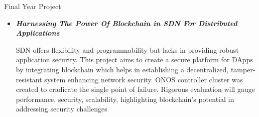 \documentclass{resume} %
\begin{document}
\begin{rSection}{Final Year Project} 
\vspace{0.25cm}
\begin{itemize}
    \item \textbf{\textit{Harnessing The Power Of Blockchain in SDN
For Distributed Applications}} 

  SDN offers flexibility and programmability
but lacks in providing robust application
security. This project aims to create a secure
platform for DApps by integrating blockchain
which helps in establishing a decentralized,
tamper-resistant system enhancing network
security. ONOS controller cluster was created
to eradicate the single point of failure.
Rigorous evaluation will gauge performance,
security, scalability, highlighting blockchain's
potential in addressing security challenges
\end{itemize}
\end{rSection}
\end{document}
